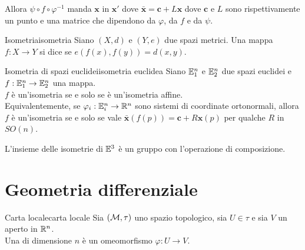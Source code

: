 \documentclass[annatarbolditalic, openany]{book}
\begin{document}
Allora $\psi \circ f \circ \varphi^{-1}$ manda $\mathbf{x}$ in $\mathbf{x}'$ dove $\mathbf{\bar{x}} = \mathbf{c} + L \mathbf{x}$ dove $\mathbf{c}$ e $L$ sono rispettivamente un punto e una matrice che dipendono da $\varphi$, da $f$ e da $\psi$.

\begin{definition}{Isometria}{isometria}
    Siano $(X,d)$ e $(Y, e)$ due spazi metrici. Una mappa $f : X \to Y$ si dice  se $e(f(x),f(y)) = d(x,y)$.
\end{definition}

\begin{theorem}{Isometria di spazi euclidei}{isometria euclidea}
    Siano $\mathbb{E}_1^n$ e $\mathbb{E}_2^n$ due spazi euclidei e $f : \mathbb{E}_1^n \to \mathbb{E}_2^n$ una mappa.\\
    $f$ è un'isometria se e solo se è un'isometria affine.\\
    Equivalentemente, se $\varphi_i : \mathbb{E}_i^n \to \mathbb{R}^n$ sono sistemi di coordinate ortonormali, allora $f$ è un'isometria se e solo se vale $\mathbf{\bar{x}}(f(p)) = \mathbf{c} + R \mathbf{x}(p)$ per qualche $R$ in $SO(n)$.
\end{theorem}

\begin{proposition}{}{}
    L'insieme delle isometrie di $\mathbb{E}^3$ è un gruppo con l'operazione di composizione.
\end{proposition}

\section{Geometria differenziale}

\begin{definition}{Carta locale}{carta locale}
    Sia $(\mathcal{M}, \tau)$ uno spazio topologico, sia $U \in \tau$ e sia $V$ un aperto in $\mathbb{R}^n$.\\
    Una  di dimensione $n$ è un omeomorfismo $\varphi : U \to V$.
\end{definition}
\end{document}
